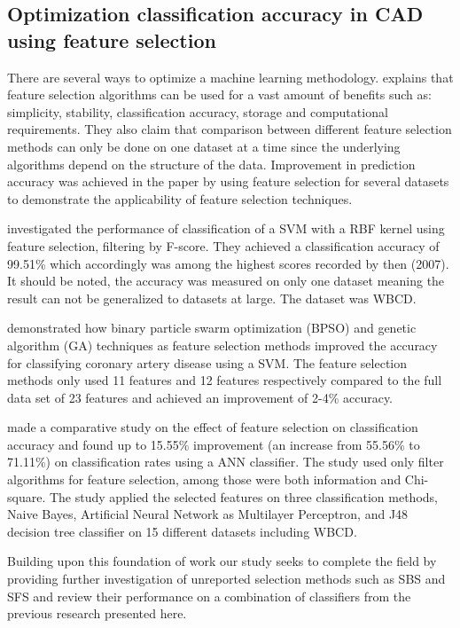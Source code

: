 \subsection{Optimization classification accuracy in CAD using feature selection}


There are several ways to optimize a machine learning methodology. \textcite{c201416} explains that feature selection algorithms can be used for a vast amount of benefits such as: simplicity, stability, classification accuracy, storage and computational requirements. They also claim that comparison between different feature selection methods can only be done on one dataset at a time since the underlying algorithms depend on the structure of the data. Improvement in prediction accuracy was achieved in the paper by using feature selection for several datasets to demonstrate the applicability of feature selection techniques.

\textcite{akay2009} investigated the performance of classification of a SVM with a RBF kernel using feature selection, filtering by F-score. They achieved a classification accuracy of 99.51\% which accordingly was among the highest scores recorded by then (2007). It should be noted, the accuracy was measured on only one dataset meaning the result can not be generalized to datasets at large. The dataset was WBCD.

\textcite{b20103177} demonstrated how  binary particle swarm optimization (BPSO) and genetic algorithm (GA) techniques as feature selection methods improved the accuracy for classifying coronary artery disease using a SVM. The feature selection methods only used 11 features and 12 features respectively compared to the full data set of 23 features and achieved an improvement of 2-4\% accuracy.

\textcite{karabulut2012} made a comparative study on the effect of feature selection on classification accuracy and found up to 15.55\% improvement (an increase from 55.56\% to 71.11\%) on classification rates using a ANN classifier. The study used only filter algorithms for feature selection, among those were both information and Chi-square. The study applied the selected features on three classification methods, Naive Bayes, Artificial Neural Network as Multilayer Perceptron, and J48 decision tree classifier on 15 different datasets including WBCD.

Building upon this foundation of work our study seeks to complete the field by providing further investigation of unreported selection methods such as SBS and SFS and review their performance on a combination of classifiers from the previous research presented here.
